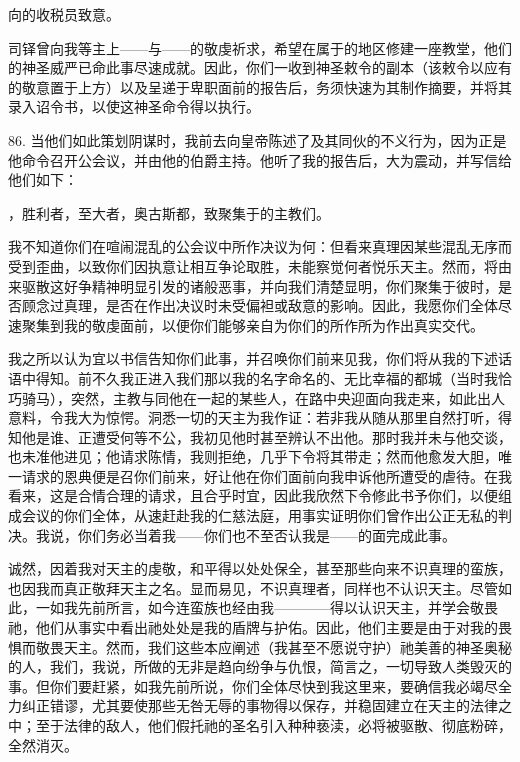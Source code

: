 \par

向的收税员致意。\par

司铎曾向我等主上——与——的敬虔祈求，希望在属于的地区修建一座教堂，他们的神圣威严已命此事尽速成就。因此，你们一收到神圣敕令的副本（该敕令以应有的敬意置于上方）以及呈递于卑职面前的报告后，务须快速为其制作摘要，并将其录入诏令书，以使这神圣命令得以执行。\par

86. 当他们如此策划阴谋时，我前去向皇帝陈述了及其同伙的不义行为，因为正是他命令召开公会议，并由他的伯爵主持。他听了我的报告后，大为震动，并写信给他们如下：\par

，胜利者，至大者，奥古斯都，致聚集于的主教们。\par

我不知道你们在喧闹混乱的公会议中所作决议为何：但看来真理因某些混乱无序而受到歪曲，以致你们因执意让相互争论取胜，未能察觉何者悦乐天主。然而，将由来驱散这好争精神明显引发的诸般恶事，并向我们清楚显明，你们聚集于彼时，是否顾念过真理，是否在作出决议时未受偏袒或敌意的影响。因此，我愿你们全体尽速聚集到我的敬虔面前，以便你们能够亲自为你们的所作所为作出真实交代。\par

我之所以认为宜以书信告知你们此事，并召唤你们前来见我，你们将从我的下述话语中得知。前不久我正进入我们那以我的名字命名的、无比幸福的都城（当时我恰巧骑马），突然，主教与同他在一起的某些人，在路中央迎面向我走来，如此出人意料，令我大为惊愕。洞悉一切的天主为我作证：若非我从随从那里自然打听，得知他是谁、正遭受何等不公，我初见他时甚至辨认不出他。那时我并未与他交谈，也未准他进见；他请求陈情，我则拒绝，几乎下令将其带走；然而他愈发大胆，唯一请求的恩典便是召你们前来，好让他在你们面前向我申诉他所遭受的虐待。在我看来，这是合情合理的请求，且合乎时宜，因此我欣然下令修此书予你们，以便组成会议的你们全体，从速赶赴我的仁慈法庭，用事实证明你们曾作出公正无私的判决。我说，你们务必当着我——你们也不至否认我是——的面完成此事。\par

诚然，因着我对天主的虔敬，和平得以处处保全，甚至那些向来不识真理的蛮族，也因我而真正敬拜天主之名。显而易见，不识真理者，同样也不认识天主。尽管如此，一如我先前所言，如今连蛮族也经由我————得以认识天主，并学会敬畏祂，他们从事实中看出祂处处是我的盾牌与护佑。因此，他们主要是由于对我的畏惧而敬畏天主。然而，我们这些本应阐述（我甚至不愿说守护）祂美善的神圣奥秘的人，我们，我说，所做的无非是趋向纷争与仇恨，简言之，一切导致人类毁灭的事。但你们要赶紧，如我先前所说，你们全体尽快到我这里来，要确信我必竭尽全力纠正错谬，尤其要使那些无咎无辱的事物得以保存，并稳固建立在天主的法律之中；至于法律的敌人，他们假托祂的圣名引入种种亵渎，必将被驱散、彻底粉碎，全然消灭。\par

